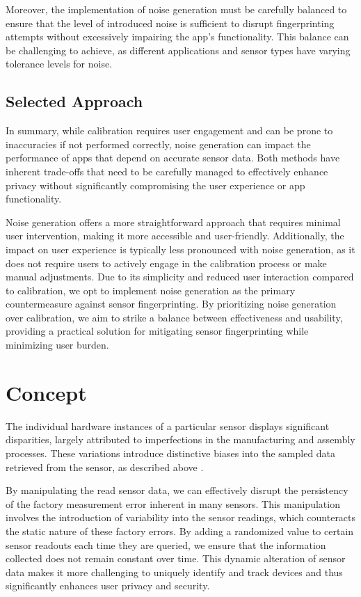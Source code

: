 \documentclass[11pt,
  oneside,openany,    %
]{scrreprt}
\begin{document}
Moreover, the implementation of noise generation must be carefully balanced to ensure that the level of introduced noise is sufficient to disrupt fingerprinting attempts without excessively impairing the app's functionality. 
This balance can be challenging to achieve, as different applications and sensor types have varying tolerance levels for noise.

\section{Selected Approach}
\label{sec:approach}
In summary, while calibration requires user engagement and can be prone to inaccuracies if not performed correctly, noise generation can impact the performance of apps that depend on accurate sensor data. 
Both methods have inherent trade-offs that need to be carefully managed to effectively enhance privacy without significantly compromising the user experience or app functionality.

Noise generation offers a more straightforward approach that requires minimal user intervention, making it more accessible and user-friendly.
Additionally, the impact on user experience is typically less pronounced with noise generation, as it does not require users to actively engage in the calibration process or make manual adjustments. 
Due to its simplicity and reduced user interaction compared to calibration, we opt to implement noise generation as the primary countermeasure against sensor fingerprinting. 
By prioritizing noise generation over calibration, we aim to strike a balance between effectiveness and usability, providing a practical solution for mitigating sensor fingerprinting while minimizing user burden.

\chapter{Concept}
\label{chap:concept}
The individual hardware instances of a particular sensor displays significant disparities, largely attributed to imperfections in the manufacturing and assembly processes. 
These variations introduce distinctive biases into the sampled data retrieved from the sensor, as described above \cite{bojinov2014mobile, 8835276, dey2014accelprint, das2014poster}. 

By manipulating the read sensor data, we can effectively disrupt the persistency of the factory measurement error inherent in many sensors.
This manipulation involves the introduction of variability into the sensor readings, which counteracts the static nature of these factory errors.
By adding a randomized value to certain sensor readouts each time they are queried, we ensure that the information collected does not remain constant over time.
This dynamic alteration of sensor data makes it more challenging to uniquely identify and track devices and thus significantly enhances user privacy and security.
\end{document}
